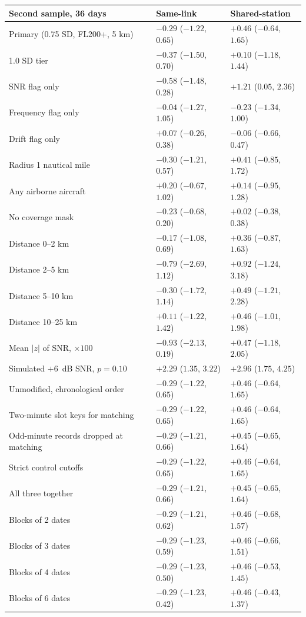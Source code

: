\documentclass[11pt]{article}
\begin{document}
\begin{appendices}
\begin{center}
\small
\begin{tabular}{lll}
\toprule
Second sample, 36 days & Same-link & Shared-station \\
\midrule
Primary (0.75 SD, FL200+, 5 km) & $-0.29$ ($-1.22$, $0.65$) & $+0.46$ ($-0.64$, $1.65$) \\
1.0 SD tier & $-0.37$ ($-1.50$, $0.70$) & $+0.10$ ($-1.18$, $1.44$) \\
SNR flag only & $-0.58$ ($-1.48$, $0.28$) & $+1.21$ ($0.05$, $2.36$) \\
Frequency flag only & $-0.04$ ($-1.27$, $1.05$) & $-0.23$ ($-1.34$, $1.00$) \\
Drift flag only & $+0.07$ ($-0.26$, $0.38$) & $-0.06$ ($-0.66$, $0.47$) \\
Radius 1 nautical mile & $-0.30$ ($-1.21$, $0.57$) & $+0.41$ ($-0.85$, $1.72$) \\
Any airborne aircraft & $+0.20$ ($-0.67$, $1.02$) & $+0.14$ ($-0.95$, $1.28$) \\
No coverage mask & $-0.23$ ($-0.68$, $0.20$) & $+0.02$ ($-0.38$, $0.38$) \\
Distance 0--2 km & $-0.17$ ($-1.08$, $0.69$) & $+0.36$ ($-0.87$, $1.63$) \\
Distance 2--5 km & $-0.79$ ($-2.69$, $1.12$) & $+0.92$ ($-1.24$, $3.18$) \\
Distance 5--10 km & $-0.30$ ($-1.72$, $1.14$) & $+0.49$ ($-1.21$, $2.28$) \\
Distance 10--25 km & $+0.11$ ($-1.22$, $1.42$) & $+0.46$ ($-1.01$, $1.98$) \\
Mean $|z|$ of SNR, $\times100$ & $-0.93$ ($-2.13$, $0.19$) & $+0.47$ ($-1.18$, $2.05$) \\
Simulated $+6$~dB SNR, $p=0.10$ & $+2.29$ ($1.35$, $3.22$) & $+2.96$ ($1.75$, $4.25$) \\
\midrule
Unmodified, chronological order & $-0.29$ ($-1.22$, $0.65$) & $+0.46$ ($-0.64$, $1.65$) \\
Two-minute slot keys for matching & $-0.29$ ($-1.22$, $0.65$) & $+0.46$ ($-0.64$, $1.65$) \\
Odd-minute records dropped at matching & $-0.29$ ($-1.21$, $0.66$) & $+0.45$ ($-0.65$, $1.64$) \\
Strict control cutoffs & $-0.29$ ($-1.22$, $0.65$) & $+0.46$ ($-0.64$, $1.65$) \\
All three together & $-0.29$ ($-1.21$, $0.66$) & $+0.45$ ($-0.65$, $1.64$) \\
Blocks of 2 dates & $-0.29$ ($-1.21$, $0.62$) & $+0.46$ ($-0.68$, $1.57$) \\
Blocks of 3 dates & $-0.29$ ($-1.23$, $0.59$) & $+0.46$ ($-0.66$, $1.51$) \\
Blocks of 4 dates & $-0.29$ ($-1.23$, $0.50$) & $+0.46$ ($-0.53$, $1.45$) \\
Blocks of 6 dates & $-0.29$ ($-1.23$, $0.42$) & $+0.46$ ($-0.43$, $1.37$) \\
\bottomrule
\end{tabular}
\end{center}


\end{appendices}
\end{document}
